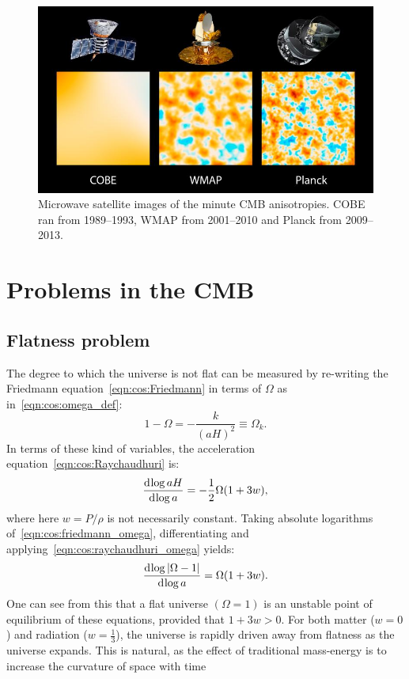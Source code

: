 \begin{figure}[tp]
  \centering
  \includegraphics[width=\textwidth]{chapters/inflationary_cosmology/figures/satellites}
  \caption{Microwave satellite images of the minute CMB anisotropies. COBE ran from 1989--1993, WMAP from 2001--2010 and Planck from 2009--2013.}\label{fig:cos:satellites}
\end{figure}

\section{Problems in the CMB}
\subsection{Flatness problem}
The degree to which the universe is not flat can be measured by re-writing the Friedmann equation~\eqref{eqn:cos:Friedmann} in terms of \(\Omega\) as in~\eqref{eqn:cos:omega_def}:
\begin{equation}
  1-\Omega = -\frac{k}{{(aH)}^2} \equiv \Omega_k.
  \label{eqn:cos:friedmann_omega}
\end{equation}
In terms of these kind of variables, the acceleration equation~\eqref{eqn:cos:Raychaudhuri} is:
\begin{equation}
  \frac{\operatorname{d}^{}\!{\log aH}}{\operatorname{d}^{}\!{\log a} } = -\frac{1}{2}\Omega(1+3w),
  \label{eqn:cos:raychaudhuri_omega}
\end{equation}
where here \(w=P/\rho\) is not necessarily constant.
Taking absolute logarithms of~\eqref{eqn:cos:friedmann_omega}, differentiating and applying~\eqref{eqn:cos:raychaudhuri_omega} yields:
\begin{equation}
  \frac{\operatorname{d}^{}\!{\log |\Omega-1|}}{\operatorname{d}^{}\!{\log a} } = \Omega(1+3w).
  \label{eqn:cos:instability}
\end{equation}
One can see from this that a flat universe \((\Omega=1)\) is an unstable point of equilibrium of these equations, provided that \(1+3w>0\). For both matter (\({w=0}\)) and radiation (\({w=\frac{1}{3}}\)), the universe is rapidly driven away from flatness as the universe expands. This is natural, as the effect of traditional mass-energy is to increase the curvature of space with time


